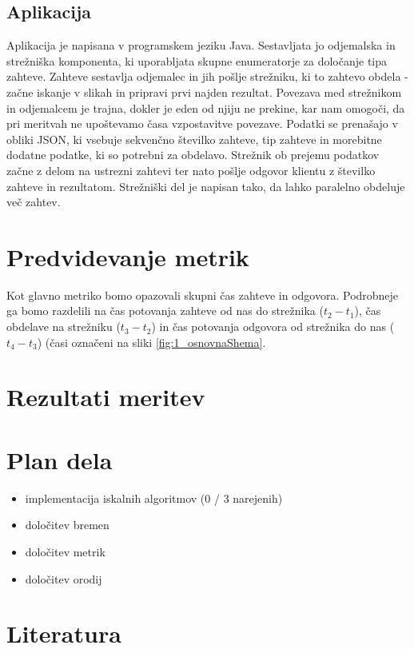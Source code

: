\subsection{Aplikacija}
Aplikacija je napisana v programskem jeziku Java. Sestavljata jo odjemalska in strežniška komponenta, ki uporabljata skupne enumeratorje za določanje tipa zahteve. Zahteve sestavlja odjemalec in jih pošlje strežniku, ki to zahtevo obdela - začne iskanje v slikah in pripravi prvi najden rezultat. Povezava med strežnikom in odjemalcem je trajna, dokler je eden od njiju ne prekine, kar nam omogoči, da pri meritvah ne upoštevamo časa vzpostavitve povezave. Podatki se prenašajo v obliki JSON, ki vsebuje sekvenčno številko zahteve, tip zahteve in morebitne dodatne podatke, ki so potrebni za obdelavo. Strežnik ob prejemu podatkov začne z delom na ustrezni zahtevi ter nato pošlje odgovor klientu z številko zahteve in rezultatom. Strežniški del je napisan tako, da lahko paralelno obdeluje več zahtev.

\section{Predvidevanje metrik}
Kot glavno metriko bomo opazovali skupni čas zahteve in odgovora. Podrobneje ga bomo razdelili na čas potovanja zahteve od nas do strežnika ($t_2 - t_1$), čas obdelave na strežniku ($t_3 - t_2$) in čas potovanja odgovora od strežnika do nas ($t_4 - t_3$) (časi označeni na sliki \ref{fig:1_osnovnaShema}.

\section{Rezultati meritev}

\section{Plan dela}
\begin{itemize}
\item implementacija iskalnih algoritmov (0 / 3 narejenih)
\item določitev bremen
\item določitev metrik
\item določitev orodij
\end{itemize}

\section{Literatura}

